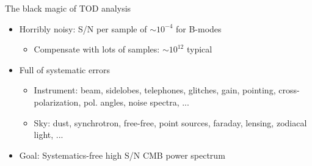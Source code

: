 \documentclass{beamer}
\begin{document}
\begin{frame}{The black magic of TOD analysis}
	\begin{itemize}
		\item Horribly noisy: S/N per sample of $\sim 10^{-4}$ for B-modes
		\begin{itemize}
			\item Compensate with lots of samples: $\sim 10^{12}$ typical
		\end{itemize}
		\item Full of systematic errors
			\begin{itemize}
				\item Instrument: beam, sidelobes, telephones, glitches, gain, pointing, cross-polarization, pol. angles, noise spectra, ...
				\item Sky: dust, synchrotron, free-free, point sources, faraday, lensing, zodiacal light, ...
			\end{itemize}
		\item Goal: Systematics-free high S/N CMB power spectrum
	\end{itemize}
\end{frame}
\end{document}
